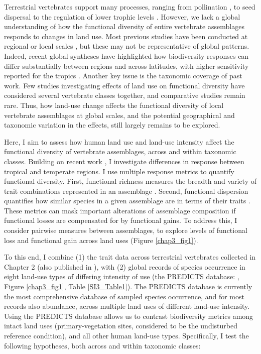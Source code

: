 Terrestrial vertebrates support many processes, ranging from pollination \citep{Ratto2018}, to seed dispersal to the regulation of lower trophic levels \citep{Barber2010, Letnic2012, Salo2010,Zhang2018}. However, we lack a global understanding of how the functional diversity of entire vertebrate assemblages responds to changes in land use. Most previous studies have been conducted at regional or local scales \citep{Davison2021}, but these may not be representative of global patterns. Indeed, recent global syntheses have highlighted how biodiversity responses can differ substantially between regions and across latitudes, with higher sensitivity reported for the tropics \citep{Matuoka2020,Millard2021, Newbold2020}. Another key issue is the taxonomic coverage of past work. Few studies investigating effects of land use on functional diversity have considered several vertebrate classes together, and comparative studies remain rare. Thus, how land-use change affects the functional diversity of local vertebrate assemblages at global scales, and the potential geographical and taxonomic variation in the effects, still largely remains to be explored.

Here, I aim to assess how human land use and land-use intensity affect the functional diversity of vertebrate assemblages, across and within taxonomic classes. Building on recent work \citep{Matuoka2020,Millard2021, Newbold2020}, I investigate differences in response between tropical and temperate regions. I use multiple response metrics to quantify functional diversity. First, functional richness measures the breadth and variety of trait combinations represented in an assemblage \citep{Legras2018}. Second, functional dispersion quantifies how similar species in a given assemblage are in terms of their traits \citep{Laliberte2010}. These metrics can mask important alterations of assemblage composition if functional losses are compensated for by functional gains. To address this, I consider pairwise measures between assemblages, to explore levels of functional loss and functional gain across land uses (Figure \ref{chap3_fig1}).



To this end, I combine (1) the trait data across terrestrial vertebrates collected in Chapter 2 (also published in \citet{Etard2020}), with (2) global records of species occurrence in eight land-use types of differing intensity of use (the PREDICTS database: \citet{Hudson2014, Hudson2017}, Figure \ref{chap3_fig1}, Table \ref{SI3_Table1}). The PREDICTS database is currently the most comprehensive database of sampled species occurrence, and for most records also abundance, across multiple land uses of different land-use intensity. Using the PREDICTS database allows us to contrast biodiversity metrics among intact land uses (primary-vegetation sites, considered to be the undisturbed reference condition), and all other human land-use types. Specifically, I test the following hypotheses, both across and within taxonomic classes:

